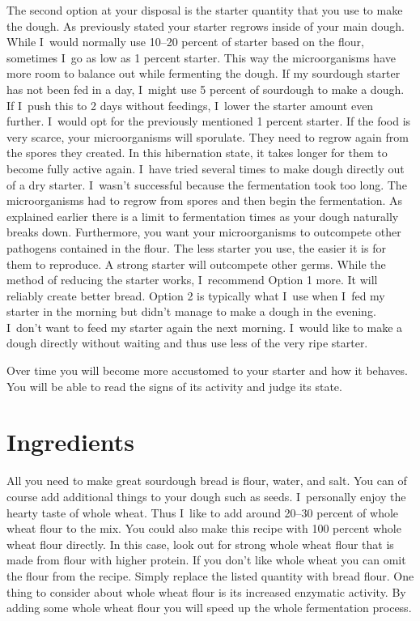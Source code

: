 The second option at your disposal is the starter quantity that
you use to make the dough. As previously stated your starter
regrows inside of your main dough. While I~would normally use
10--20 percent of starter based on the flour, sometimes I~go
as low as 1 percent starter. This way the microorganisms have
more room to balance out while fermenting the dough. If my sourdough
starter has not been fed in a day, I~might use 5 percent of sourdough
to make a dough. If I~push this to 2 days without feedings,
I~lower the starter amount even further. I~would opt for the
previously mentioned 1 percent starter. If the food is very scarce,
your microorganisms will sporulate. They need to regrow again
from the spores they created. In this hibernation state, it takes
longer for them to become fully active again. I~have tried
several times to make dough directly out of a dry starter.
I~wasn't successful because the fermentation took too long.
The microorganisms had to regrow from spores and then begin
the fermentation. As explained earlier there is a limit to
fermentation times as your dough naturally breaks down.
Furthermore, you want your microorganisms to outcompete
other pathogens contained in the flour. The less starter
you use, the easier it is for them to reproduce. A strong
starter will outcompete other germs. While the method of
reducing the starter works, I~recommend Option 1 more.
It will reliably create better bread. Option 2 is typically
what I~use when I~fed my starter in the morning but didn't
manage to make a dough in the evening. I~don't want to feed
my starter again the next morning. I~would like to make a dough
directly without waiting and thus use less of the very ripe starter.

Over time you will become more accustomed to your starter
and how it behaves. You will be able to read the signs of its
activity and judge its state.

\section{Ingredients}

All you need to make great sourdough bread is flour, water, and salt. You
can of course add additional things to your dough such as seeds. I~personally
enjoy the hearty taste of whole wheat. Thus I~like to add around 20--30 percent
of whole wheat flour to the mix. You could also make this recipe with 100 percent
whole wheat flour directly. In this case, look out for strong whole wheat
flour that is made from flour with higher protein. If you don't like whole
wheat you can omit the flour from the recipe. Simply replace the listed
quantity with bread flour. One thing to consider about whole wheat
flour is its increased enzymatic activity. By adding some whole wheat
flour you will speed up the whole fermentation process.

